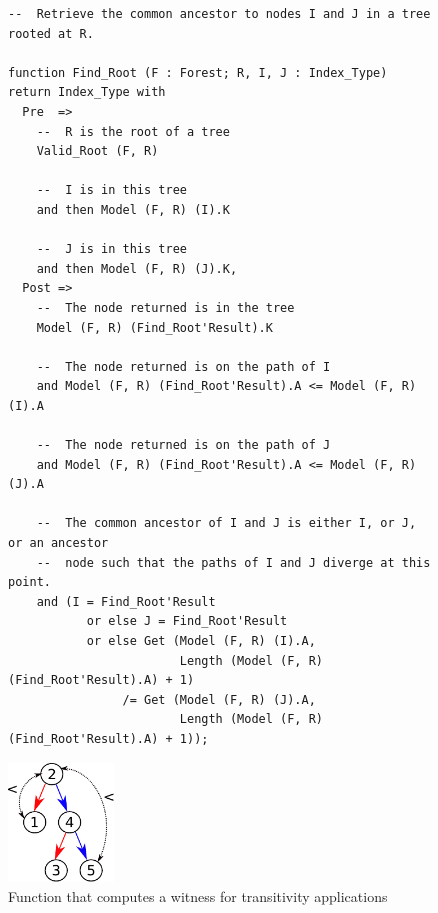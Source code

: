\documentclass[11pt,a4paper]{article}
\begin{document}
\begin{figure}
\begin{minipage}[c]{\linewidth}
\begin{small}
\begin{lstlisting}
--  Retrieve the common ancestor to nodes I and J in a tree rooted at R.

function Find_Root (F : Forest; R, I, J : Index_Type) return Index_Type with
  Pre  =>
    --  R is the root of a tree
    Valid_Root (F, R)

    --  I is in this tree
    and then Model (F, R) (I).K

    --  J is in this tree
    and then Model (F, R) (J).K,
  Post =>
    --  The node returned is in the tree
    Model (F, R) (Find_Root'Result).K

    --  The node returned is on the path of I
    and Model (F, R) (Find_Root'Result).A <= Model (F, R) (I).A

    --  The node returned is on the path of J
    and Model (F, R) (Find_Root'Result).A <= Model (F, R) (J).A

    --  The common ancestor of I and J is either I, or J, or an ancestor
    --  node such that the paths of I and J diverge at this point.
    and (I = Find_Root'Result
           or else J = Find_Root'Result
           or else Get (Model (F, R) (I).A,
                        Length (Model (F, R) (Find_Root'Result).A) + 1)
                /= Get (Model (F, R) (J).A,
                        Length (Model (F, R) (Find_Root'Result).A) + 1));
\end{lstlisting}
\end{small}
\end{minipage}\hspace*{-30mm}
\begin{minipage}[c]{.22\linewidth}
\begin{center}
\vspace*{-35mm}
\includegraphics[width=28mm]{transitivity.pdf}
\end{center}
\end{minipage}
\caption{\label{fig-proof-wit} Function that computes a witness for transitivity applications}
\end{figure}
\end{document}
